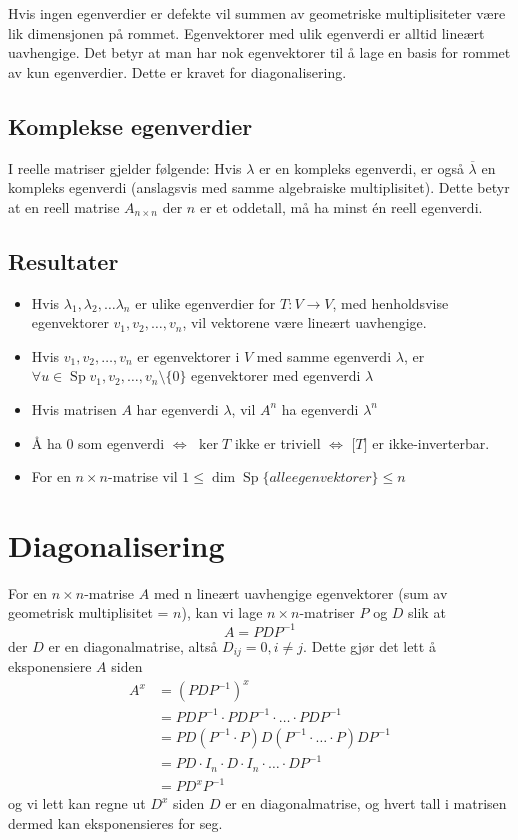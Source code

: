 \documentclass[12pt,a4paper,norsk]{article}
\DeclareMathOperator{\Sp}{Sp} %
\begin{document}
Hvis ingen egenverdier er defekte vil summen av geometriske
multiplisiteter være lik dimensjonen på rommet. Egenvektorer med ulik
egenverdi er alltid lineært uavhengige. Det betyr at man har nok egenvektorer
til å lage en basis for rommet av kun egenverdier. Dette er kravet for
diagonalisering.

\subsection{Komplekse egenverdier}
I reelle matriser gjelder følgende: Hvis $\lambda$ er en kompleks egenverdi, er
også $\overline{\lambda}$ en kompleks egenverdi (anslagsvis med samme
algebraiske multiplisitet). Dette betyr at en reell matrise $A_{n \times n}$ der
$n$ er et oddetall, må ha minst én reell egenverdi.

\subsection{Resultater}
\begin{itemize}
  \item Hvis $\lambda_{1}, \lambda_{2}, \ldots \lambda_{n}$ er ulike
    egenverdier for $T:V\rightarrow V$, med henholdsvise egenvektorer
    $v_{1}, v_{2}, \ldots, v_{n}$, vil vektorene være lineært uavhengige.
  \item Hvis $v_{1}, v_{2}, \ldots, v_{n}$ er egenvektorer i $V$ med samme egenverdi
    $\lambda$, er $\forall u \in \Sp{v_{1}, v_{2}, \ldots, v_{n}}\setminus\{0\}$ egenvektorer med
    egenverdi $\lambda$
  \item Hvis matrisen $A$ har egenverdi $\lambda$, vil $A^{n}$ ha egenverdi $\lambda^{n}$
  \item Å ha $0$ som egenverdi $\iff$ $\ker T$ ikke er triviell $\iff$ $\lbrack T \rbrack$ er
    ikke-inverterbar.
  \item For en $n \times n$-matrise vil $1 \le \dim \Sp\{alle egenvektorer\} \le n$
\end{itemize}

\section{Diagonalisering}
For en $n \times n$-matrise $A$ med n lineært uavhengige egenvektorer (sum av geometrisk
multiplisitet = $n$), kan vi lage $n \times n$-matriser $P$ og $D$ slik at
\[ A = PDP^{-1} \]
der $D$ er en diagonalmatrise, altså $D_{ij} = 0, i \ne j$. Dette gjør det lett å
eksponensiere $A$ siden
\begin{align*}
  A^{x} &= {(PDP^{-1})}^{x} \\
        &= PD P^{-1} \cdot P D P^{-1} \cdot \ldots \cdot P DP^{-1} \\
        &= PD (P^{-1} \cdot P) D (P^{-1} \cdot \ldots \cdot P) DP^{-1} \\
        &= PD \cdot I_{n} \cdot D \cdot I_{n} \cdot \ldots \cdot DP^{-1} \\
        &= PD^{x}P^{-1}
\end{align*}
og vi lett kan regne ut $D^{x}$ siden $D$ er en diagonalmatrise, og hvert tall i
matrisen dermed kan eksponensieres for seg.
\end{document}
